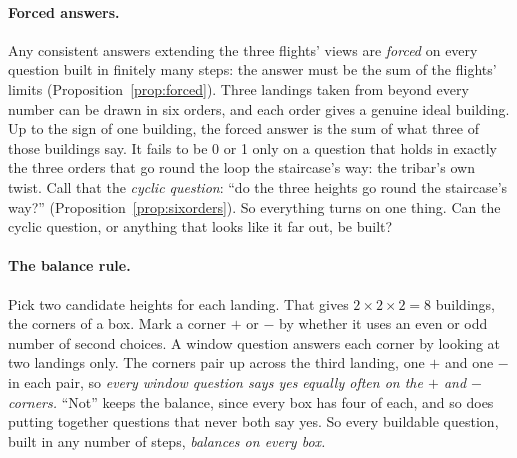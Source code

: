 \documentclass[11pt]{article}
\theoremstyle{plain}
\theoremstyle{definition}
\begin{document}
\paragraph{Forced answers.} Any consistent answers extending the three flights'
views are \emph{forced} on every question built in finitely many steps: the
answer must be the sum of the flights' limits (Proposition~\ref{prop:forced}).
Three landings taken from beyond every number can be drawn in six orders, and
each order gives a genuine ideal building. Up to the sign of one building, the
forced answer is the sum of what three of those buildings say. It fails to be 0
or 1 only on a question that holds in exactly the three orders that go round the
loop the staircase's way: the tribar's own twist. Call that the \emph{cyclic
question}: ``do the three heights go round the staircase's way?''
(Proposition~\ref{prop:sixorders}). So everything turns on one thing. Can the
cyclic question, or anything that looks like it far out, be built?

\paragraph{The balance rule.} Pick two candidate heights for each landing. That
gives $2\times2\times2=8$ buildings, the corners of a box. Mark a corner
$+$ or $-$ by whether it uses an even or odd number of second choices. A
window question answers each corner by looking at two landings only. The
corners pair up across the third landing, one $+$ and one $-$ in each pair, so
\emph{every window question says yes equally often on the $+$ and $-$ corners.}
``Not'' keeps the balance, since every box has four of each, and so does putting
together questions that never both say yes. So every buildable question, built
in any number of steps, \emph{balances on every box.}
\end{document}
